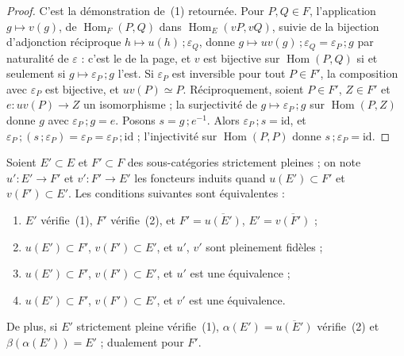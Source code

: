 \begin{proof}
C'est la démonstration de~(1) retournée. Pour $P, Q \in F$, l'application $g \mapsto v(g)$, de $\operatorname{Hom}_F(P, Q)$ dans $\operatorname{Hom}_E(vP, vQ)$, suivie de la bijection d'adjonction réciproque $h \mapsto u(h)\,;\varepsilon_Q$, donne $g \mapsto uv(g)\,;\varepsilon_Q = \varepsilon_P\,;g$ par naturalité de $\varepsilon$ : c'est le  de la page, et $v$ est bijective sur $\operatorname{Hom}(P, Q)$ si et seulement si $g \mapsto \varepsilon_P\,;g$ l'est. Si $\varepsilon_P$ est inversible pour tout $P \in F'$, la composition avec $\varepsilon_P$ est bijective, et $uv(P) \simeq P$. Réciproquement, soient $P \in F'$, $Z \in F'$ et $e : uv(P) \to Z$ un isomorphisme ; la surjectivité de $g \mapsto \varepsilon_P\,;g$ sur $\operatorname{Hom}(P, Z)$ donne $g$ avec $\varepsilon_P\,;g = e$. Posons $s = g\,;e^{-1}$. Alors $\varepsilon_P\,;s = \mathrm{id}$, et $\varepsilon_P\,;(s\,;\varepsilon_P) = \varepsilon_P = \varepsilon_P\,;\mathrm{id}$ ; l'injectivité sur $\operatorname{Hom}(P, P)$ donne $s\,;\varepsilon_P = \mathrm{id}$.
\end{proof}

\begin{enonce}
Soient $E' \subset E$ et $F' \subset F$ des sous-catégories strictement pleines ; on note $u' : E' \to F'$ et $v' : F' \to E'$ les foncteurs induits quand $u(E') \subset F'$ et $v(F') \subset E'$. Les conditions suivantes sont équivalentes :
\begin{enumerate}
\item $E'$ vérifie~(1), $F'$ vérifie~(2), et $F' = \overline{u(E')}$, $E' = \overline{v(F')}$ ;
\item $u(E') \subset F'$, $v(F') \subset E'$, et $u'$, $v'$ sont pleinement fidèles ;
\item $u(E') \subset F'$, $v(F') \subset E'$, et $u'$ est une équivalence ;
\item $u(E') \subset F'$, $v(F') \subset E'$, et $v'$ est une équivalence.
\end{enumerate}
De plus, si $E'$ strictement pleine vérifie~(1), $\alpha(E') = \overline{u(E')}$ vérifie~(2) et $\beta(\alpha(E')) = E'$ ; dualement pour $F'$.
\end{enonce}

